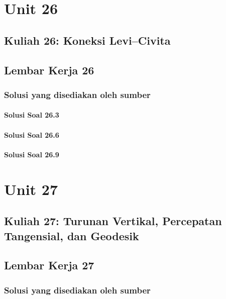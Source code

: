 \documentclass[11pt,a4paper,oneside]{book}
\begin{document}
\part{Unit 26}
\chapter[Kuliah 26]{Kuliah 26: Koneksi Levi--Civita}


\chapter{Lembar Kerja 26}


\section*{Solusi yang disediakan oleh sumber}
\subsection*{Solusi Soal 26.3}

\subsection*{Solusi Soal 26.6}

\subsection*{Solusi Soal 26.9}


\part{Unit 27}
\chapter[Kuliah 27]{Kuliah 27: Turunan Vertikal, Percepatan Tangensial, dan Geodesik}


\chapter{Lembar Kerja 27}


\section*{Solusi yang disediakan oleh sumber}
\end{document}
